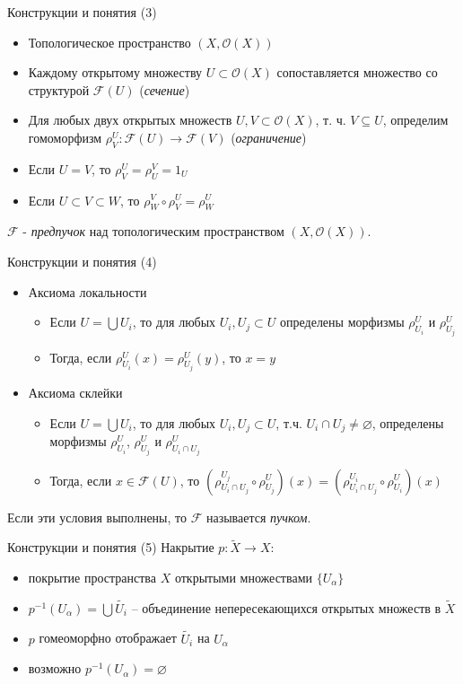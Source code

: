 \documentclass{beamer}
\begin{document}
\begin{frame}{Конструкции и понятия (3)}
\begin{itemize}
	\item Топологическое пространство $(X, \mathcal{O}(X))$
	\item Каждому открытому множеству $U \subset \mathcal{O}(X)$ сопоставляется множество со структурой $\mathcal{F}(U)$ (\textit{сечение})
	\item Для любых двух открытых множеств $U, V \subset \mathcal{O}(X)$, т. ч. $V \subseteq U$, определим гомоморфизм $\rho^U_V : \mathcal{F}(U) \to \mathcal{F}(V)$ (\textit{ограничение})
	\item Если $U = V$, то $\rho^U_V = \rho^V_U = 1_U$
	\item Если $U \subset V \subset W$, то $\rho^V_W \circ \rho^U_V = \rho^U_W$
\end{itemize}
\bigskip
$\mathcal{F}$ - \textit{предпучок} над топологическим пространством $(X, \mathcal{O}(X))$.
\end{frame}

\begin{frame}{Конструкции и понятия (4)}
\begin{itemize}
	\item Аксиома локальности
		\medskip
		\begin{itemize}
			\item Если $U = \bigcup U_i$, то для любых $U_i, U_j \subset U$ определены морфизмы $\rho^U_{U_i}$ и $\rho^U_{U_j}$
			\medskip
			\item Тогда, если $\rho^U_{U_i}(x) = \rho^U_{U_j}(y)$, то $x = y$
		\end{itemize}
	\bigskip
	\item Аксиома склейки
		\medskip
		\begin{itemize}
			\item Если $U = \bigcup U_i$, то для любых $U_i, U_j \subset U$, т.ч. $U_i \cap U_j \neq \varnothing$, определены морфизмы $\rho^U_{U_i}$, $\rho^U_{U_j}$ и $\rho^U_{U_i \cap U_j}$
			\medskip
			\item Тогда, если $x \in \mathcal{F}(U)$, то $(\rho^{U_j}_{U_i \cap U_j} \circ \rho^U_{U_j})(x) = (\rho^{U_i}_{U_i \cap U_j} \circ \rho^U_{U_i})(x)$
		\end{itemize}
\end{itemize}
\bigskip
Если эти условия выполнены, то $\mathcal{F}$ называется \textit{пучком}.
\end{frame}

\begin{frame}{Конструкции и понятия (5)}
Накрытие $p : \widetilde{X} \to X$:
\bigskip
\begin{itemize}
	\item покрытие пространства $X$ открытыми множествами $\{ U_\alpha \}$
	\item $p^{-1}(U_\alpha) = \bigcup \widetilde{U_i}$ -- объединение непересекающихся открытых множеств в $\widetilde{X}$
	\item $p$ гомеоморфно отображает $\widetilde{U_i}$ на $U_\alpha$
	\item возможно $p^{-1}(U_\alpha) = \varnothing$
\end{itemize}
\end{frame}
\end{document}
